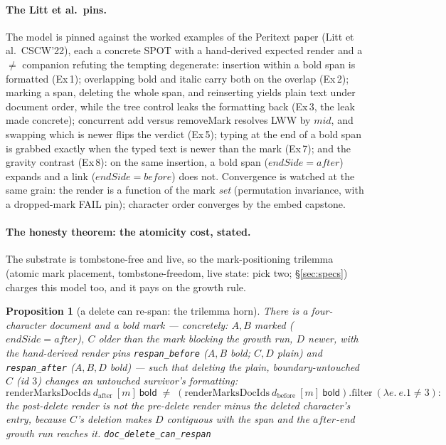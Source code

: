 \documentclass[11pt]{article}
\newtheorem{proposition}[theorem]{Proposition}
\newcommand{\lean}[1]{\texttt{#1}}
\begin{document}
\paragraph{The Litt et al.\ pins.} The model is pinned against the
worked examples of the Peritext paper (Litt et al.\ CSCW'22), each a
concrete SPOT with a hand-derived expected render and a $\neq$
companion refuting the tempting degenerate: insertion within a bold
span is formatted (Ex\,1); overlapping bold and italic carry both on
the overlap (Ex\,2); marking a span, deleting the whole span, and
reinserting yields plain text under document order, while the tree
control leaks the formatting back (Ex\,3, the leak made concrete);
concurrent add versus removeMark resolves LWW by $\mathit{mid}$, and
swapping which is newer flips the verdict (Ex\,5); typing at the end
of a bold span is grabbed exactly when the typed text is newer than
the mark (Ex\,7); and the gravity contrast (Ex\,8): on the same
insertion, a bold span ($\mathit{endSide} = \mathit{after}$) expands
and a link ($\mathit{endSide} = \mathit{before}$) does not.
Convergence is watched at the same grain: the render is a function of
the mark \emph{set} (permutation invariance, with a dropped-mark FAIL
pin); character order converges by the embed capstone.

\paragraph{The honesty theorem: the atomicity cost, stated.} The
substrate is tombstone-free and live, so the mark-positioning trilemma
(atomic mark placement, tombstone-freedom, live state: pick two;
\S\ref{sec:specs}) charges this model too, and it pays on the growth
rule.

\begin{proposition}[a delete can re-span: the trilemma horn]
\label{prop:respan}
There is a four-character document and a bold mark --- concretely:
$A, B$ marked ($\mathit{endSide} = \mathit{after}$), $C$ older than
the mark blocking the growth run, $D$ newer, with the hand-derived
render pins \lean{respan\_before} ($A, B$ bold; $C, D$ plain) and
\lean{respan\_after} ($A, B, D$ bold) --- such that deleting the
plain, boundary-untouched $C$ (id $3$) changes an untouched
survivor's formatting:
\[
  \mathrm{renderMarksDocIds}\ d_{\mathrm{after}}\ [m]\ \mathsf{bold}
  \;\ne\;
  (\mathrm{renderMarksDocIds}\ d_{\mathrm{before}}\ [m]\
  \mathsf{bold}).\mathrm{filter}\ (\lambda e.\ e.1 \ne 3) :
\]
the post-delete render is \emph{not} the pre-delete render minus the
deleted character's entry, because $C$'s deletion makes $D$
contiguous with the span and the $\mathit{after}$-end growth run
reaches it.
\hfill\lean{doc\_delete\_can\_respan}
\end{proposition}
\end{document}
